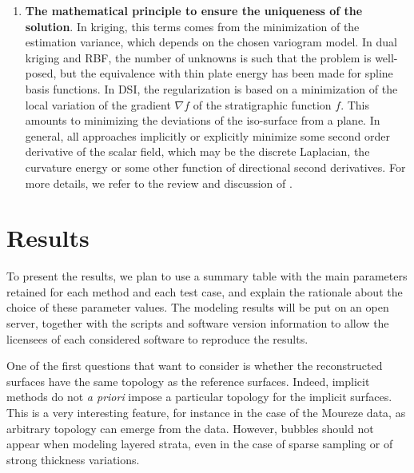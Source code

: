 \documentclass[final]{ring20}
\begin{document}
\begin{enumerate}
\item \textbf{The mathematical principle to ensure the uniqueness of the solution}. In kriging, this terms comes from the minimization of the estimation variance, which depends on the chosen variogram model. In dual kriging and RBF, the number of unknowns is such that the problem is well-posed, but the equivalence with thin plate energy has been made for spline basis functions. In DSI, the regularization is based on a minimization of the local variation of the gradient $\nabla f$ of the stratigraphic function $f$. This amounts to minimizing the deviations of the iso-surface from a plane. In general, all approaches implicitly or explicitly minimize some second order derivative of the scalar field, which may be the discrete Laplacian, the curvature energy or some other function of directional second derivatives. For more details, we refer to the review and discussion of \citet{Renaudeau2019MG}.

\end{enumerate}


\section{Results}\label{sec:results}


To present the results, we plan to use a summary table with the main parameters retained for each method and each test case, and explain the rationale about the choice of these parameter values. The modeling results will be put on an open server, together with the scripts and software version information to allow the licensees of each considered software to reproduce the results. 


One of the first questions that want to consider is whether the reconstructed surfaces have the same topology as the reference surfaces. Indeed, implicit methods do not \textit{a priori} impose a particular topology for the implicit surfaces. This is a very interesting feature, for instance in the case of the Moureze data, as arbitrary topology can emerge from the data. However, bubbles should not appear when modeling layered strata, even in the case of sparse sampling or of strong thickness variations. 
\end{document}
